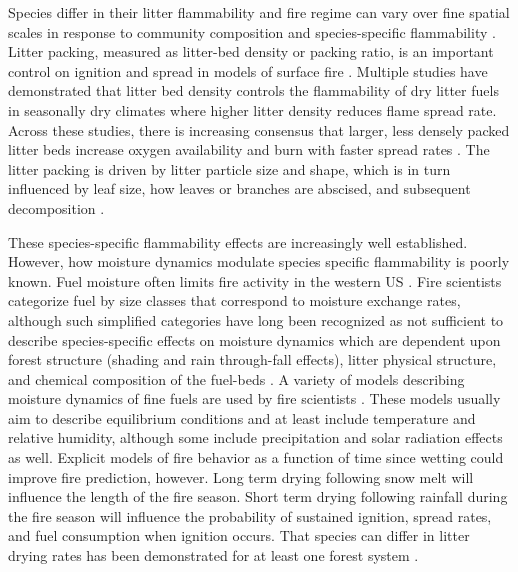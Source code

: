 \documentclass[letterpaper,12pt]{article}
\begin{document}
Species differ in their litter flammability \citep{Fonda+Belanger+etal-1998,
  Fonda-2001, Scarff+Westoby-2006, Kane+Varner+etal-2008,
  Cornwell+Elvira+etal-2015} and fire regime can vary over fine spatial scales
in response to community composition and species-specific flammability
\citep{Stephens-2001, Hille+Stephens-2005, Schwilk+Caprio-2011}. Litter
packing, measured as litter-bed density or packing ratio, is an important
control on ignition and spread in models of surface fire \citep{Weber-1991,
  Balbi+Santoni+etal-1999, Morvan+Larini-2001}. Multiple studies have
demonstrated that litter bed density controls the flammability of dry litter
fuels in seasonally dry climates where higher litter density reduces flame
spread rate. Across these studies, there is increasing consensus that larger,
less densely packed litter beds increase oxygen availability and burn with
faster spread rates \citep{Scarff+Westoby-2006, Schwilk+Caprio-2011,
  Magalhaes+Schwilk-2012, Cornwell+Elvira+etal-2015, Varner+Kane+etal-2015,
  Kreye+Varner+etal-2018}. The litter packing is driven by litter particle size
and shape, which is in turn influenced by leaf size, how leaves or branches are
abscised, and subsequent decomposition \citep{Fonda+Belanger+etal-1998,
  Stephens+Finney+etal-2004, Scarff+Westoby-2006, Kane+Varner+etal-2008,
  Cornwell+Elvira+etal-2015, Zhao+Cornwell+etal-2016,
  Grootemaat+Wright+etal-2017, Prior+Murphy+etal-2018,
  Zhao+vanLogtestijn+etal-2019}.

These species-specific flammability effects are increasingly well established.
However, how moisture dynamics modulate species specific flammability is poorly
known. Fuel moisture often limits fire activity in the western US
\citep{Miller+Urban-1999, Parks+Parisien-2014}. Fire scientists categorize fuel
by size classes that correspond to moisture exchange rates, although such
simplified categories have long been recognized as not sufficient to describe
species-specific effects on moisture dynamics \citep{Anderson-1985} which are
dependent upon forest structure (shading and rain through-fall effects), litter
physical structure, and chemical composition of the fuel-beds
\citep{Nelson+Hiers-2008, Matthews-2014, Kreye_Hiers_etal-2018}. A variety of
models describing moisture dynamics of fine fuels are used by fire scientists
\citep{Viney-1991, Nelson-2000, Catchpole+Catchpole+etal-2001}. These models
usually aim to describe equilibrium conditions and at least include temperature
and relative humidity, although some include precipitation and solar radiation
effects as well. Explicit models of fire behavior as a function of time since
wetting could improve fire prediction, however. Long term drying following snow
melt will influence the length of the fire season. Short term drying following
rainfall during the fire season will influence the probability of sustained
ignition, spread rates, and fuel consumption when ignition occurs. That species
can differ in litter drying rates has been demonstrated for at least one forest
system \citep{Kreye+Varner+etal-2013}.
\end{document}
